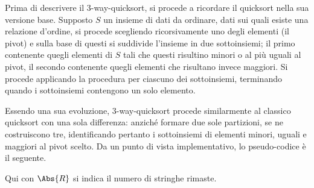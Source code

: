 \documentclass{subfiles}
\begin{document}
Prima di descrivere il 3-way-quicksort, si procede a ricordare il quicksort nella sua versione base.
Supposto \(S\) un insieme di dati da ordinare, dati sui quali esiste una relazione d'ordine,
si procede scegliendo ricorsivamente uno degli elementi (il pivot) e sulla base di questi si suddivide l'insieme in due sottoinsiemi;
il primo contenente quegli elementi di \(S\) tali che questi risultino minori o al più uguali al pivot, il secondo contenente quegli elementi che risultano invece maggiori.
Si procede applicando la procedura per ciascuno dei sottoinsiemi, terminando quando i sottoinsiemi contengono un solo elemento.

Essendo una sua evoluzione, 3-way-quicksort procede similarmente al classico quicksort con una sola differenza: anziché formare due sole partizioni,
se ne costruiscono tre, identificando pertanto i sottoinsiemi di elementi minori, uguali e maggiori al pivot scelto.
Da un punto di vista implementativo, lo pseudo-codice è il seguente.

\begin{Remark*}
    Qui con \(\Abs{R}\) si indica il numero di stringhe rimaste.

\end{Remark*}
\end{document}
